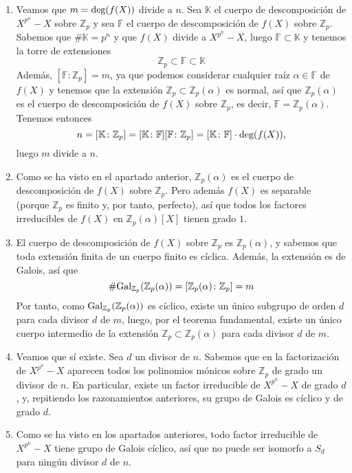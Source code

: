 \documentclass[11pt]{report}
\makeatletter
\renewenvironment{proof}[1][\proofname]{\par
  \pushQED{\qed}%
  \normalfont \topsep\z@skip %
  \trivlist
  \item[\hskip\labelsep
        \itshape
    #1\@addpunct{.}]\ignorespaces
}{%
  \popQED\endtrivlist\@endpefalse
}
\newcommand{\Z}{\mathbb Z}
\newcommand{\F}{\mathbb F}
\newcommand{\K}{\mathbb K}
\makeatother
\begin{document}
\begin{proof}
    \hfill
    \begin{enumerate}
        \item Veamos que $m=\textup{deg}(f(X))$ divide a $n$. Sea $\K$ el cuerpo de descomposición de $X^{p^n}-X$ sobre $\Z_p$ y sea $\F$ el cuerpo de descomposición de $f(X)$ sobre $\Z_p$. Sabemos que $\#\K = p^n$ y que $f(X)$ divide a $X^{p^n}-X$, luego $\F \subset \K$ y tenemos la torre de extensiones
        \[\Z_p \subset \F \subset \K\]
        Además, $[\F \colon \Z_p] = m$, ya que podemos considerar cualquier raíz $\alpha \in \F$ de $f(X)$ y tenemos que la extensión $\Z_p \subset \Z_p(\alpha)$ es normal, así que $\Z_p(\alpha)$ es el cuerpo de descomposición de $f(X)$ sobre $\Z_p$, es decir, $\F=\Z_p(\alpha)$. Tenemos entonces
        \[n = [\K \colon \Z_p] = [\K \colon \F] [\F \colon \Z_p] = [\K \colon \F] \cdot \textup{deg}(f(X)),\]
        luego $m$ divide a $n$.
        \item Como se ha visto en el apartado anterior, $\Z_p(\alpha)$ es el cuerpo de descomposición de $f(X)$ sobre $\Z_p$. Pero además $f(X)$ es separable (porque $\Z_p$ es finito y, por tanto, perfecto), así que todos los factores irreducibles de $f(X)$ en $\Z_p(\alpha)[X]$ tienen grado $1$.
        \item El cuerpo de descomposición de $f(X)$ sobre $\Z_p$ es $\Z_p(\alpha)$, y sabemos que toda extensión finita de un cuerpo finito es cíclica. Además, la extensión es de Galois, así que \[\#\textup{Gal}_{\Z_p}(\Z_p(\alpha)) = [\Z_p(\alpha) \colon \Z_p] =m\] Por tanto, como $\textup{Gal}_{\Z_p}(\Z_p(\alpha))$ es cíclico, existe un único subgrupo de orden $d$ para cada divisor $d$ de $m$, luego, por el teorema fundamental, existe un único cuerpo intermedio de la extensión $\Z_p \subset \Z_p(\alpha)$ para cada divisor $d$ de $m$.
        \item Veamos que sí existe. Sea $d$ un divisor de $n$. Sabemos que en la factorización de $X^{p^n}-X$ aparecen todos los polinomios mónicos sobre $\Z_p$ de grado un divisor de $n$. En particular, existe un factor irreducible de $X^{p^n}-X$ de grado $d$, y, repitiendo los razonamientos anteriores, su grupo de Galois es cíclico y de grado $d$.
        \item Como se ha visto en los apartados anteriores, todo factor irreducible de $X^{p^n}-X$ tiene grupo de Galois cíclico, así que no puede ser isomorfo a $S_d$ para ningún divisor $d$ de $n$. \qedhere
    \end{enumerate}
\end{proof}
\end{document}
